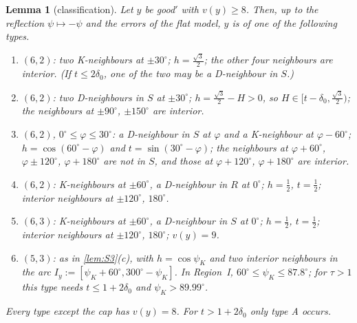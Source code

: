 \documentclass[11pt]{amsart}
\newtheorem{lemma}[theorem]{Lemma}
\theoremstyle{definition}
\theoremstyle{remark}
\begin{document}
\begin{lemma}[classification]\label{lem:classP4}
Let $y$ be good$'$ with $v(y)\ge8$. Then, up to the reflection $\psi\mapsto-\psi$ and the errors of the flat model, $y$ is of one of the following types.
\begin{enumerate}[leftmargin=4.2em]
\item[\textup{(A)}] $(6,2)$: two K-neighbours at $\pm30^\circ$; $h=\frac{\sqrt3}2$; the other four neighbours are interior. (If $t\le2\delta_0$, one of the two may be a D-neighbour in $S$.)
\item[\textup{(B)}] $(6,2)$: two D-neighbours in $S$ at $\pm30^\circ$; $h=\frac{\sqrt3}2-H>0$, so $H\in[t-\delta_0,\frac{\sqrt3}2)$; the neighbours at $\pm90^\circ$, $\pm150^\circ$ are interior.
\item[\textup{(C$_\varphi$)}] $(6,2)$, $0^\circ\le\varphi\le30^\circ$: a D-neighbour in $S$ at $\varphi$ and a K-neighbour at $\varphi-60^\circ$; $h=\cos(60^\circ-\varphi)$ and $t=\sin(30^\circ-\varphi)$; the neighbours at $\varphi+60^\circ$, $\varphi\pm120^\circ$, $\varphi+180^\circ$ are not in $S$, and those at $\varphi+120^\circ$, $\varphi+180^\circ$ are interior.
\item[\textup{(A$'$)}] $(6,2)$: K-neighbours at $\pm60^\circ$, a D-neighbour in $R$ at $0^\circ$; $h=\frac12$, $t=\frac12$; interior neighbours at $\pm120^\circ$, $180^\circ$.
\item[\textup{(cap)}] $(6,3)$: K-neighbours at $\pm60^\circ$, a D-neighbour in $S$ at $0^\circ$; $h=\frac12$, $t=\frac12$; interior neighbours at $\pm120^\circ$, $180^\circ$; $v(y)=9$.
\item[\textup{(Dt)}] $(5,3)$: as in \cref{lem:S3}(c), with $h=\cos\psi_K$ and two interior neighbours in the arc $I_y:=[\psi_K+60^\circ,300^\circ-\psi_K]$. In Region~I, $60^\circ\le\psi_K\le87.8^\circ$; for $\tau>1$ this type needs $t\le1+2\delta_0$ and $\psi_K>89.99^\circ$.
\end{enumerate}
Every type except the cap has $v(y)=8$. For $t>1+2\delta_0$ only type A occurs.
\end{lemma}
\end{document}
